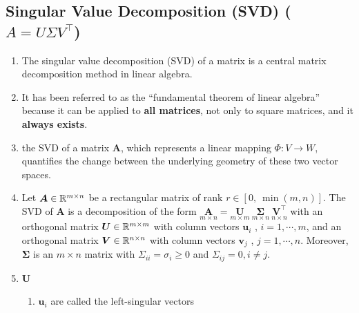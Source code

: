 \subsection{Singular Value Decomposition (SVD) ($A = U \Sigma V^\top$)}



\begin{enumerate}
    \item The singular value decomposition (SVD) of a matrix is a central matrix decomposition method in linear algebra.
    \hfill \cite{mfml/book/mml/Deisenroth-Faisal-Ong}

    \item It has been referred to as the “fundamental theorem of linear algebra” because it can be applied to \textbf{all matrices}, not only to square matrices, and it \textbf{always exists}.
    \hfill \cite{mfml/book/mml/Deisenroth-Faisal-Ong}

    \item the SVD of a matrix $\bm{A}$, which represents a linear mapping $\Phi : V \to W$, quantifies the change between the underlying geometry of these two vector spaces.
    \hfill \cite{mfml/book/mml/Deisenroth-Faisal-Ong}

    \item 
    \begin{theorem}
        Let $\bm{A} \in \mathbb{R}^{m\times n}$ be a rectangular matrix of rank $r \in [0,\ \min(m, n)]$. 
        The SVD of $\bm{A}$ is a decomposition of the form 
        $
            \underset{\displaystyle m\times n}{\bm{A}} = 
            \underset{\displaystyle m\times m}{\bm{U}}\ 
            \underset{\displaystyle m\times n}{\bm{\Sigma}}\ 
            \underset{\displaystyle n\times n}{\bm{V}^\top}
        $ 
        with an orthogonal matrix $\bm{U} \in \mathbb{R}^{m\times m}$ with column vectors $\bm{u}_i$ , $i = 1, \cdots , m$, and an orthogonal matrix $\bm{V} \in \mathbb{R}^{n\times n}$ with column vectors $\bm{v}_j$ , $j = 1, \cdots , n$.
        Moreover, $\bm{\Sigma}$ is an $m \times n$ matrix with $\Sigma_{ii} = \sigma_i \geq 0$ and $\Sigma_{ij} = 0, i \neq j$.
        \hfill \cite{mfml/book/mml/Deisenroth-Faisal-Ong}
    \end{theorem}

    \item $\bm{U}$
    \begin{enumerate}
        \item $\bm{u}_i$ are called the left-singular vectors
        \hfill \cite{mfml/book/mml/Deisenroth-Faisal-Ong}
    \end{enumerate}


\end{enumerate}
